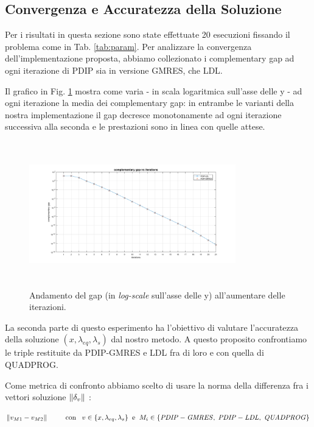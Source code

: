 \subsection{Convergenza e Accuratezza della Soluzione}

Per i risultati in questa sezione sono state effettuate 20 esecuzioni fissando il problema come in Tab. \ref{tab:param}.
Per analizzare la convergenza dell'implementazione proposta, abbiamo collezionato i complementary gap ad ogni iterazione di PDIP sia in versione GMRES, che LDL.

Il grafico in Fig. \ref{fig:gap} mostra come varia - in scala logaritmica sull'asse delle y - ad ogni iterazione la media dei complementary gap: in entrambe le varianti della nostra implementazione il gap decresce monotonamente ad ogni iterazione successiva alla seconda e le prestazioni sono in linea con quelle attese.

\begin{figure}[!h]
    \centering
    \includegraphics[width=0.8\textwidth, height=6.3cm]{img/MU6.png}
    \caption{Andamento del gap (in \textit{log-scale} sull'asse delle y) all'aumentare delle iterazioni. \label{fig:gap}}
\end{figure}

La seconda parte di questo esperimento ha l'obiettivo di valutare l'accuratezza della soluzione $(x, \lambda_{eq}, \lambda_s)$ dal nostro metodo. A questo proposito confrontiamo le triple restituite da PDIP-GMRES e LDL fra di loro e con quella di QUADPROG. 

Come metrica di confronto abbiamo scelto di usare la norma della differenza fra i vettori soluzione $\left\lVert\delta_v\right\rVert$ :

\begin{equation}\label{ep:acc}
     \left\lVert v_{M1} - v_{M2}\right\rVert \;\;\;\;\;\;\;\;\; \mathrm{con} \;\;\; v\in \{ x, \lambda_{eq}, \lambda_s\} \;\; \mathrm{e} \;\; M_i \in \{{\scriptsize\mathit{PDIP-GMRES},\; \mathit{PDIP-LDL}, \; \mathit{QUADPROG}}\}
\end{equation}

